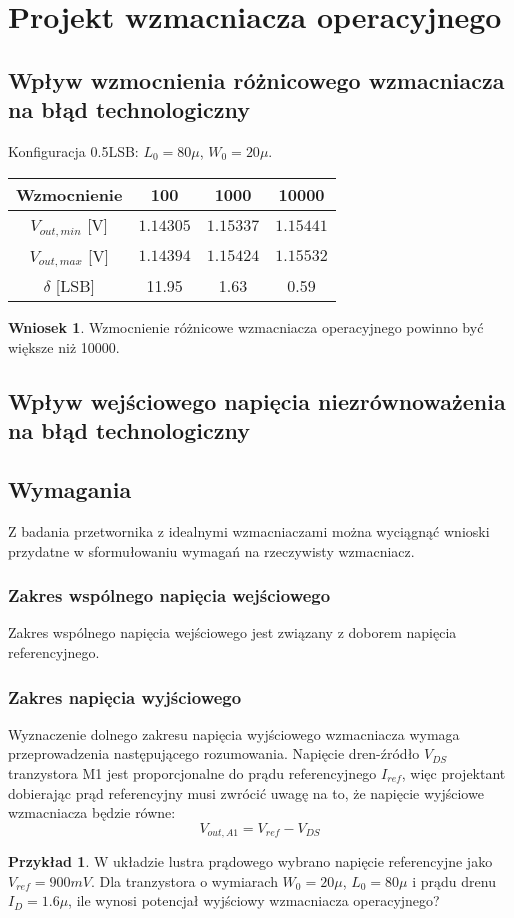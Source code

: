 \documentclass[10pt,a4paper,twoside]{report}
\theoremstyle{definition}
\theoremstyle{definition}
\theoremstyle{definition}
\newtheorem{przyklad}{Przykład}[section]
\theoremstyle{definition}
\theoremstyle{definition}
\newtheorem{wniosek}{Wniosek}[section]
\begin{document}
{{{{	\section{Projekt wzmacniacza operacyjnego}
	\subsection{Wpływ wzmocnienia różnicowego wzmacniacza na błąd technologiczny}
	{	Konfiguracja 0.5LSB: $L_0 = 80\mu$, $W_0 = 20\mu$.	}
	\begin{center}
		\begin{tabular}{|c|c|c|c|}
			\hline 
			Wzmocnienie & 100 & 1000 & 10000 \\ 
			\hline 
			$V_{out,min}$ [V] & $1.14305$ & $1.15337$ & $1.15441$ \\ 
			\hline
			$V_{out,max}$ [V] & $1.14394$ & $1.15424$ & $1.15532$ \\ 
			\hline 
			$\delta$ [LSB]  & 11.95 & 1.63 & 0.59 \\
			\hline
		\end{tabular} 
	\end{center}
	\begin{wniosek}{Wzmocnienie różnicowe wzmacniacza operacyjnego powinno być większe niż 10000.}
	\end{wniosek}
	\subsection{Wpływ wejściowego napięcia niezrównoważenia na błąd technologiczny}

	\subsection{Wymagania}
	{	Z badania przetwornika z idealnymi wzmacniaczami można wyciągnąć wnioski przydatne w sformułowaniu wymagań na rzeczywisty wzmacniacz. }
	\subsubsection{Zakres wspólnego napięcia wejściowego}
	{	Zakres wspólnego napięcia wejściowego jest związany z doborem napięcia referencyjnego.}
	\subsubsection{Zakres napięcia wyjściowego}
	{	Wyznaczenie dolnego zakresu napięcia wyjściowego wzmacniacza wymaga przeprowadzenia następującego rozumowania. Napięcie dren-źródło $V_{DS}$ tranzystora M1 jest proporcjonalne do prądu referencyjnego $I_{ref}$, więc projektant dobierając prąd referencyjny musi zwrócić uwagę na to, że napięcie wyjściowe wzmacniacza będzie równe:
		\begin{equation}
			V_{out,A1} = V_{ref} - V_{DS}
		\end{equation} 
	\begin{przyklad}{W układzie lustra prądowego wybrano napięcie referencyjne jako $V_{ref} = 900mV$. Dla tranzystora o wymiarach $W_0=20\mu$, $L_0=80\mu$ i prądu drenu $I_{D}=1.6\mu$, ile wynosi potencjał wyjściowy wzmacniacza operacyjnego?}
		

\end{przyklad}}}}}}
\end{document}

